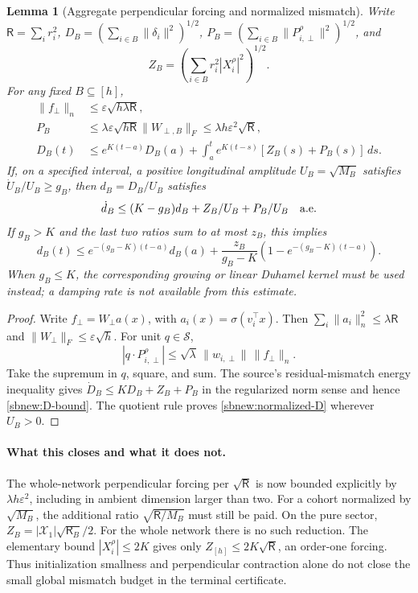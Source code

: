 \documentclass{article} %
\theoremstyle{plain}
\newtheorem{lemma}[theorem]{Lemma}
\theoremstyle{definition}
\theoremstyle{remark}
\begin{document}
\begin{lemma}[Aggregate perpendicular forcing and normalized mismatch]
\label{sbnew:forcing}
Write $\mathsf R=\sum_i r_i^2$, $D_B=(\sum_{i\in B}\|\delta_i\|^2)^{1/2}$,
$P_B=(\sum_{i\in B}\|P_{i,\perp}^\rho\|^2)^{1/2}$, and
\[
 Z_B=\left(\sum_{i\in B}r_i^2|X_i^\rho|^2\right)^{1/2}.
\]
For any fixed $B\subseteq[h]$,
\begin{align}
 \|f_\perp\|_n&\le\varepsilon\sqrt{h\lambda\mathsf R},\label{sbnew:fperp}\\
 P_B&\le\lambda\varepsilon\sqrt{h\mathsf R}
           \|W_{\perp,B}\|_F
       \le\lambda h\varepsilon^2\sqrt{\mathsf R},\label{sbnew:P-bound}\\
 D_B(t)&\le e^{K(t-a)}D_B(a)
       +\int_a^t e^{K(t-s)}[Z_B(s)+P_B(s)]\,ds.\label{sbnew:D-bound}
\end{align}
If, on a specified interval, a positive longitudinal amplitude
$U_B=\sqrt{M_B}$ satisfies $\dot U_B/U_B\ge g_B$, then
$d_B=D_B/U_B$ satisfies
\begin{equation}\label{sbnew:normalized-D}
 \dot d_B\le(K-g_B)d_B+Z_B/U_B+P_B/U_B\quad\hbox{a.e.}
\end{equation}
If $g_B>K$ and the last two ratios sum to at most $z_B$, this implies
\[
 d_B(t)\le e^{-(g_B-K)(t-a)}d_B(a)
 +\frac{z_B}{g_B-K}(1-e^{-(g_B-K)(t-a)}).
\]
When $g_B\le K$, the corresponding growing or linear Duhamel kernel must
be used instead; a damping rate is not available from this estimate.
\end{lemma}
\begin{proof}
Write $f_\perp=W_\perp a(x)$, with $a_i(x)=\sigma(v_i^\top x)$.
Then $\sum_i\|a_i\|_n^2\le\lambda\mathsf R$ and
$\|W_\perp\|_F\le\varepsilon\sqrt h$. For unit $q\in\mathcal S$,
\[
 |q\cdot P_{i,\perp}^\rho|
 \le\sqrt\lambda\,\|w_{i,\perp}\|\,\|f_\perp\|_n.
\]
Take the supremum in $q$, square, and sum. The source's residual-mismatch
energy inequality gives $\dot D_B\le KD_B+Z_B+P_B$ in the regularized
norm sense and hence \eqref{sbnew:D-bound}. The quotient rule proves
\eqref{sbnew:normalized-D} wherever $U_B>0$.
\end{proof}

\paragraph{What this closes and what it does not.}
The whole-network perpendicular forcing per $\sqrt{\mathsf R}$ is now
bounded explicitly by $\lambda h\varepsilon^2$, including in ambient
dimension larger than two. For a cohort normalized by $\sqrt{M_B}$, the
additional ratio $\sqrt{\mathsf R/M_B}$ must still be paid. On the pure
sector, $Z_B=|\mathcal X_1|\sqrt{\mathsf R_B}/2$. For the whole network
there is no such reduction. The elementary bound
$|X_i^\rho|\le2K$ gives only $Z_{[h]}\le2K\sqrt{\mathsf R}$, an order-one
forcing. Thus initialization smallness and perpendicular contraction alone
do not close the small global mismatch budget in the terminal certificate.
\end{document}
